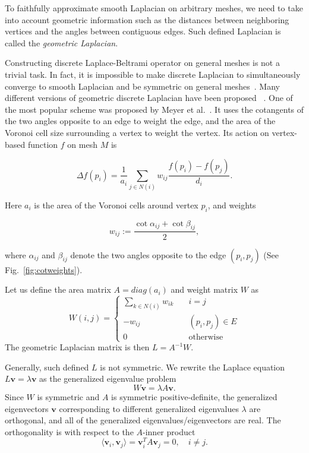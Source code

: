 To faithfully approximate smooth Laplacian on arbitrary meshes, we need to take
into account geometric information such as the distances between neighboring
vertices and the angles between contiguous edges. Such defined Laplacian is
called the \emph{geometric Laplacian}.

Constructing discrete Laplace-Beltrami operator on general meshes is not a trivial task.
In fact, it is impossible to make discrete Laplacian to simultaneously converge to smooth
Laplacian and be symmetric on general meshes~\cite{Rustamov:2007:LEF}. Many different
versions of geometric discrete Laplacian have been proposed
~\cite{pinkall1993computing, Desbrun1999, Xu:2004:GMP, Levy2006, Vallet2008, Belkin:2008:SCG}.
One of the most popular scheme was proposed by Meyer et al.~\cite{Meyer2003}.
It uses the cotangents of the two angles opposite to an edge to weight the edge,
and the area of the Voronoi cell size surrounding a vertex to weight the vertex.
Its action on vertex-based function $f$ on mesh $M$ is

\begin{equation}
\Delta f(p_i)=\frac{1}{a_i}\sum_{j\in N(i)}w_{ij}\frac{f(p_i)-f(p_j)}{d_i}.
\end{equation}

Here $a_i$ is the area of the Voronoi cells around vertex $p_i$, and weights

\begin{equation}
w_{ij}:=\frac{\cot\alpha_{ij}+\cot\beta_{ij}}{2},
\end{equation}

where $\alpha_{ij}$ and $\beta_{ij}$ denote the two angles opposite to the edge $(p_i,p_j)$
(See Fig.~\ref{fig:cotweights}).

Let us define the area matrix $A=diag(a_i)$ and weight matrix $W$ as
\begin{equation*}
W(i,j)=\left\{
       \begin{array}{lc}
        \sum_{k\in N(i)}w_{ik}\quad & i=j \\
        -w_{ij}\quad & (p_i,p_j)\in E \\
        0\quad & \text{otherwise}
    \end{array}
\right.
\end{equation*}
The geometric Laplacian matrix is then $L=A^{-1}W$.

Generally, such defined $L$ is not symmetric. We rewrite the Laplace equation $L\mathbf{v}=\lambda\mathbf{v}$ as the generalized eigenvalue problem
\begin{equation}
W\mathbf{v}=\lambda A\mathbf{v}.
\end{equation}
Since $W$ is symmetric and $A$ is symmetric positive-definite, the generalized eigenvectors $\mathbf{v}$ corresponding to different generalized eigenvalues $\lambda$ are orthogonal, and all of the generalized eigenvalues/eigenvectors are real. The orthogonality is with respect to the $A$-inner product
\begin{equation*}
\langle\mathbf{v}_i,\mathbf{v}_j\rangle=\mathbf{v}_i^T A\mathbf{v}_j=0,\quad i\neq j.
\end{equation*}

